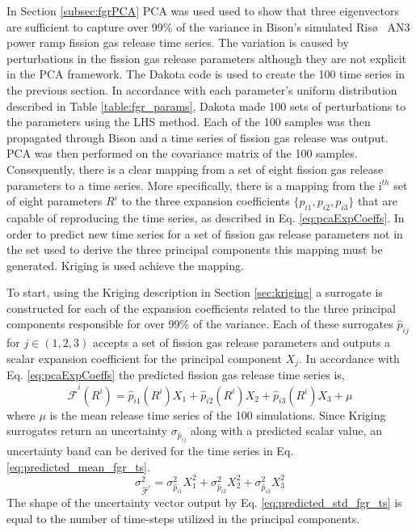 In Section \ref{subsec:fgrPCA} \ac{PCA} was used used to show that three eigenvectors are sufficient to capture over 99\% of the variance in Bison's simulated Ris\o~ AN3 power ramp fission gas release time series. The variation is caused by perturbations in the fission gas release parameters although they are not explicit in the \ac{PCA} framework. The Dakota code is used to create the 100 time series in the previous section. In accordance with each parameter's uniform distribution described in Table \ref{table:fgr_params}, Dakota made 100 sets of perturbations to the parameters using the \ac{LHS} method. Each of the 100 samples was then propagated through Bison and a time series of fission gas release was output. \ac{PCA} was then performed on the covariance matrix of the 100 samples. Consequently, there is a clear mapping from a set of eight fission gas release parameters to a time series. More specifically, there is a mapping from the i$^{th}$ set of eight parameters $R^{i}$ to the three expansion coefficients $\lbrace p_{i1}, p_{i2}, p_{i3} \rbrace$ that are capable of reproducing the time series, as described in Eq. \ref{eq:pcaExpCoeffs}. In order to predict new time series for a set of fission gas release parameters not in the set used to derive the three principal components this mapping must be generated. Kriging is used achieve the mapping.  

To start, using the Kriging description in Section \ref{sec:kriging} a surrogate is constructed for each of the expansion coefficients related to the three principal components responsible for over 99\% of the variance. Each of these surrogates $\hat{p}_{ij}$ for $j\in\left(1,2,3\right)$ accepts a set of fission gas release parameters and outputs a scalar expansion coefficient for the principal component $X_j$. In accordance with Eq. \ref{eq:pcaExpCoeffs} the predicted fission gas release time series is,
\begin{equation}
\label{eq:predicted_mean_fgr_ts}
 \hat{\mathcal{F}}^{i}(R^i) = \hat{p}_{i1}\left(R^i\right) X_1 + \hat{p}_{i2}\left(R^i\right) X_2 + \hat{p}_{i3}\left(R^i\right) X_3 + \mu  
\end{equation}
where $\mu$ is the mean release time series of the 100 simulations. Since Kriging surrogates return an uncertainty $\sigma_{\hat{p}_{ij}}$ along with a predicted scalar value, an uncertainty band can be derived for the time series in Eq. \ref{eq:predicted_mean_fgr_ts}.
\begin{equation}
\label{eq:predicted_std_fgr_ts}
 \sigma_{ \hat{\mathcal{F}}^i }^2 = \sigma_{\hat{p}_{i1}}^2 X_1^2 + \sigma_{\hat{p}_{i2}}^2 X_2^2 + \sigma_{\hat{p}_{i3}}^2 X_3^2 
\end{equation}
The shape of the uncertainty vector output by Eq. \ref{eq:predicted_std_fgr_ts} is equal to the number of time-steps utilized in the principal components. 

